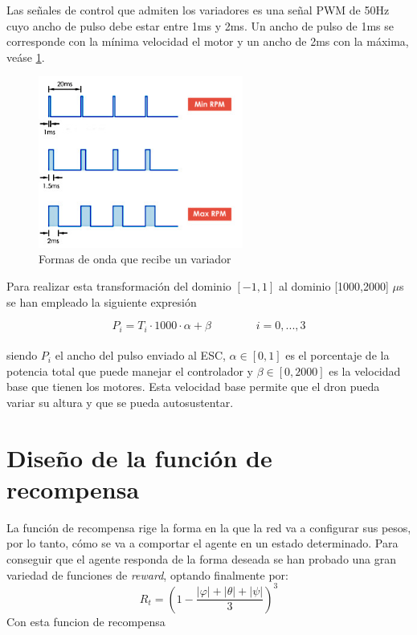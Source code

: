 Las señales de control que admiten los variadores es una señal PWM de 50Hz cuyo ancho de pulso debe estar entre 1ms y 2ms. Un ancho de pulso de 1ms se corresponde con la mínima velocidad el motor y un ancho de 2ms con la máxima, veáse \cref{hardware_ESCWAVE}.\newpage

\begin{figure}[htb!]
	\centering
	\includegraphics[width=0.6\textwidth]{hardware/ESCWaves}
	\caption{Formas de onda que recibe un variador}
	\label{hardware_ESCWAVE}	
\end{figure}

 Para realizar esta transformación del dominio $[-1,1]$ al dominio [1000,2000] $\mu$s se han empleado la siguiente expresión

\begin{equation}
	P_i= T_i \cdot 1000 \cdot \alpha + \beta \qquad \qquad i=0,...,3
\end{equation}\\
siendo $P_i$ el ancho del pulso enviado al ESC, $\alpha \in [0,1]$  es el porcentaje de la potencia total que puede manejar el controlador y $\beta \in [0,2000]$ es la velocidad base que tienen los motores. Esta velocidad base permite que el dron pueda variar su altura y que se pueda autosustentar. 

\section{Diseño de la función de recompensa}
La función de recompensa rige la forma en la que la red va a configurar sus pesos, por lo tanto, cómo se va a comportar el agente en un estado determinado.
Para conseguir que el agente responda de la forma deseada se han probado una gran variedad de funciones de \textit{reward}, optando finalmente por:
\begin{equation}
	R_t = \left( 1-\frac{|\varphi|  + |\theta| + |\psi|}{3}\right)^3
\end{equation}
Con esta funcion de recompensa 

